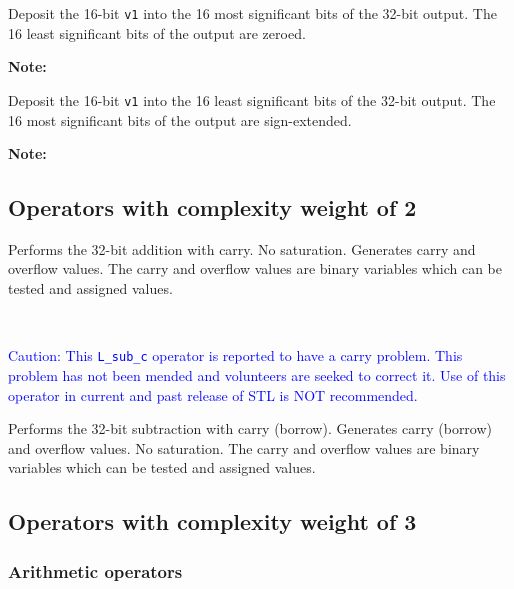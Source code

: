 
Deposit the 16-bit {\tt v1} into the 16 most significant bits
of the 32-bit output. The 16 least significant bits of the output
are zeroed.

\textbf{Note:} \hfill {}


Deposit the 16-bit {\tt v1} into the 16 least significant bits
of the 32-bit output. The 16 most significant bits of the output
are sign-extended.

\textbf{Note:} \hfill {}

\subsection{Operators with complexity weight of 2}


Performs the 32-bit addition with carry. No saturation. Generates
carry and overflow values. The carry and overflow values are
binary variables which can be tested and assigned values.

\ \\

\textcolor{blue}{
%
  Caution: This {\tt L\_sub\_c} operator is reported to have a carry
  problem. This problem has not been mended and volunteers are seeked
  to correct it. Use of this operator in current and past release of
  STL is NOT recommended.
%
}

Performs the 32-bit subtraction with carry (borrow). Generates
carry (borrow) and overflow values. No saturation. The carry and
overflow values are binary variables which can be tested and
assigned values. 

\subsection{Operators with complexity weight of 3}
\subsubsection{Arithmetic operators}

